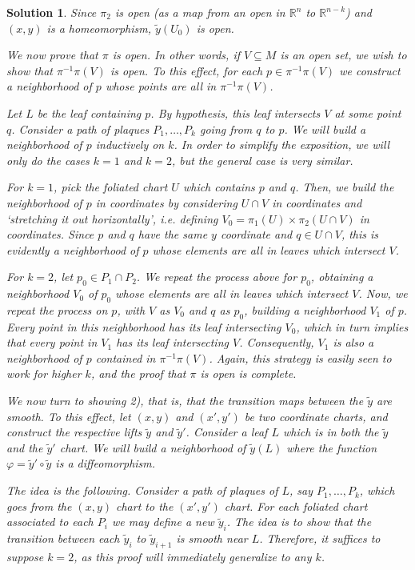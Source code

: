 \documentclass{article}
\theoremstyle{nonumberplain}
\newtheorem{sol}{Solution}
\newcommand{\R}{\mathbb{R}}
\begin{document}
\begin{sol}
Since $\pi_2$ is open (as a map from an open in $\R^n$ to $\R^{n-k}$) and $(x,y)$ is a homeomorphism, $\tilde y(U_0)$ is open.

We now prove that $\pi$ is open. In other words, if $V \subseteq M$ is an open set, we wish to show that $\pi^{-1} \pi(V)$ is open. To this effect, for each $p \in \pi^{-1}\pi(V)$ we construct a neighborhood of $p$ whose points are all in $\pi^{-1}\pi(V)$.

Let $L$ be the leaf containing $p$. By hypothesis, this leaf intersects $V$ at some point $q$. Consider a path of plaques $P_1, \dots, P_k$ going from $q$ to $p$. We will build a neighborhood of $p$ inductively on $k$. In order to simplify the exposition, we will only do the cases $k = 1$ and $k = 2$, but the general case is very similar.

For $k = 1$, pick the foliated chart $U$ which contains $p$ and $q$. Then, we build the neighborhood of $p$ in coordinates by considering $U \cap V$ in coordinates and `stretching it out horizontally', i.e. defining $V_0 = \pi_1(U) \times \pi_2(U \cap V)$ in coordinates. Since $p$ and $q$ have the same $y$ coordinate and $q \in U \cap V$, this is evidently a neighborhood of $p$ whose elements are all in leaves which intersect $V$.

For $k = 2$, let $p_0 \in P_1 \cap P_2$. We repeat the process above for $p_0$, obtaining a neighborhood $V_0$ of $p_0$ whose elements are all in leaves which intersect $V$. Now, we repeat the process on $p$, with $V$ as $V_0$ and $q$ as $p_0$, building a neighborhood $V_1$ of $p$. Every point in this neighborhood has its leaf intersecting $V_0$, which in turn implies that every point in $V_1$ has its leaf intersecting $V$. Consequently, $V_1$ is also a neighborhood of $p$ contained in $\pi^{-1}\pi(V)$. Again, this strategy is easily seen to work for higher $k$, and the proof that $\pi$ is open is complete.

We now turn to showing 2), that is, that the transition maps between the $\tilde y$ are smooth. To this effect, let $(x,y)$ and $(x',y')$ be two coordinate charts, and construct the respective lifts $\tilde y$ and $\tilde y'$. Consider a leaf $L$ which is in both the $\tilde y$ and the $\tilde y'$ chart. We will build a neighborhood of $\tilde y(L)$ where the function $\varphi = \tilde y' \circ \tilde y$ is a diffeomorphism.

The idea is the following. Consider a path of plaques of $L$, say $P_1, \dots, P_k$, which goes from the $(x,y)$ chart to the $(x',y')$ chart. For each foliated chart associated to each $P_i$ we may define a new $\tilde y_i$. The idea is to show that the transition between each $\tilde y_i$ to $\tilde y_{i+1}$ is smooth near $L$. Therefore, it suffices to suppose $k = 2$, as this proof will immediately generalize to any $k$.


\end{sol}
\end{document}
